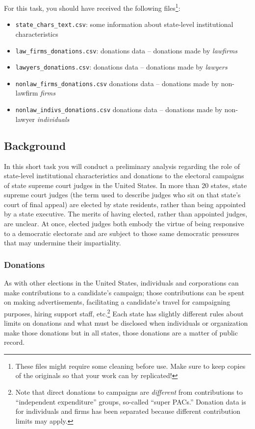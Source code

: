 \documentclass[11pt, letterpaper, twoside]{article}
\begin{document}
For this task, you should have received the following files\footnote{These files might require some cleaning before use. Make sure to keep copies of the originals so that your work can by replicated!}:
\begin{itemize}
    \item \verb|state_chars_text.csv|: some information about state-level institutional characteristics
    \item \verb|law_firms_donations.csv|: donations data -- donations made by \textit{lawfirms}
    \item \verb|lawyers_donations.csv|: donations data -- donations made by \textit{lawyers}
    \item \verb|nonlaw_firms_donations.csv| donations data -- donations made by non-lawfirm \textit{firms}
    \item \verb|nonlaw_indivs_donations.csv| donations data -- donations made by non-lawyer \textit{individuals} 
\end{itemize}

\subsection*{Background}
In this short task you will conduct a preliminary analysis regarding the role of state-level institutional characteristics and donations to the electoral campaigns of state supreme court judges in the United States. In more than 20 states, state supreme court judges (the term used to describe judges who sit on that state's court of final appeal) are elected by state residents, rather than being appointed by a state executive. The merits of having elected, rather than appointed judges, are unclear. At once, elected judges both embody the virtue of being responsive to a democratic electorate and are subject to those same democratic pressures that may undermine their impartiality. 

\subsubsection*{Donations}
As with other elections in the United States, individuals and corporations can make contributions to a candidate's campaign; those contributions can be spent on making advertisements, facilitating a candidate's travel for campaigning purposes, hiring support staff, etc.\footnote{Note that direct donations to campaigns are \textit{different} from contributions to ``independent expenditure'' groups, so-called ``super PACs.'' Donation data is for individuals and firms has been separated because different contribution limits may apply.} Each state has slightly different rules about limits on donations and what must be disclosed when individuals or organization make those donations but in all states, those donations are a matter of public record.
\end{document}
